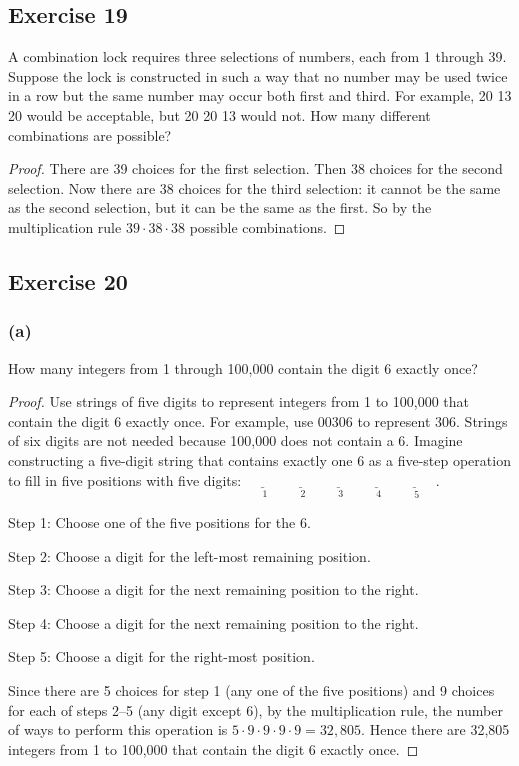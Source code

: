 \documentclass[14pt]{extarticle}
\newcommand{\fbl}{\underline{\hspace{1cm}}\,\,}
\newcommand{\cy}{\color{cyan}}
\begin{document}
\subsection{Exercise 19}
A combination lock requires three selections of numbers, each from 1 through 39. Suppose the lock is constructed in
such a way that no number may be used twice in a row but the same number may occur both first and third. For
example, 20 13 20 would be acceptable, but 20 20 13 would not. How many different combinations are possible?

\begin{proof}
     There are 39 choices for the first selection. Then 38 choices for the second selection. Now there are 38 choices
     for the third selection: it cannot be the same as the second selection, but it can be the same as the first. So
     by the multiplication rule \(39 \cdot 38 \cdot 38\) possible combinations.
\end{proof}

\subsection{Exercise 20}
\subsubsection{(a)}
How many integers from 1 through 100,000 contain the digit 6 exactly once?

\begin{proof}
     Use strings of five digits to represent integers from 1 to 100,000 that contain the digit 6 exactly once. For example,
     use 00306 to represent 306. Strings of six digits are not needed because 100,000 does not contain a 6. Imagine
     constructing a five-digit string that contains exactly one 6 as a five-step operation to fill in five positions with
     five digits: \(\underset{1}{\fbl} \underset{2}{\fbl} \underset{3}{\fbl} \underset{4}{\fbl} \underset{5}{\fbl}\).

          {\cy Step 1:} Choose one of the five positions for the 6.

          {\cy Step 2:} Choose a digit for the left-most remaining position.

          {\cy Step 3:} Choose a digit for the next remaining position to the right.

          {\cy Step 4:} Choose a digit for the next remaining position to the right.

          {\cy Step 5:} Choose a digit for the right-most position.

     Since there are 5 choices for step 1 (any one of the five positions) and 9 choices for each of steps 2–5 (any digit
     except 6), by the multiplication rule, the number of ways to perform this operation is \(5 \cdot 9 \cdot 9 \cdot 9
     \cdot 9 = 32,805\). Hence there are 32,805 integers from 1 to 100,000 that contain the digit 6 exactly once.
\end{proof}
\end{document}
